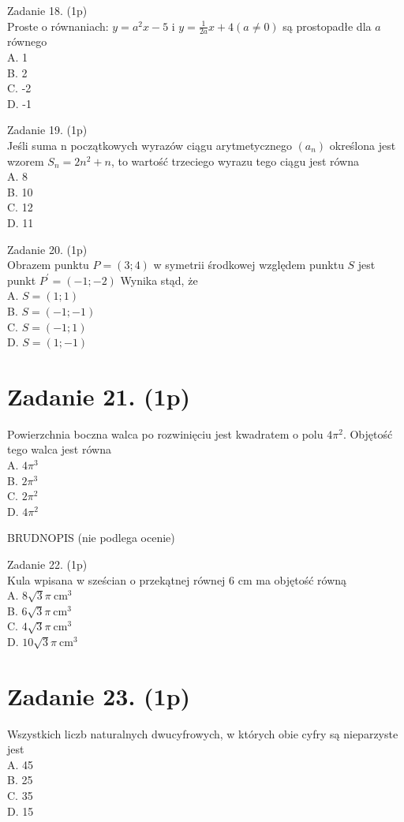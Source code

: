 \documentclass[10pt]{article}
\begin{document}
Zadanie 18. (1p)\\
Proste o równaniach: \(y=a^{2} x-5\) i \(y=\frac{1}{2 a} x+4(a \neq 0)\) są prostopadłe dla \(a\) równego\\
A. 1\\
B. 2\\
C. -2\\
D. -1

Zadanie 19. (1p)\\
Jeśli suma n początkowych wyrazów ciągu arytmetycznego \(\left(a_{n}\right)\) określona jest wzorem \(S_{n}=2 n^{2}+n\), to wartość trzeciego wyrazu tego ciągu jest równa\\
A. 8\\
B. 10\\
C. 12\\
D. 11

Zadanie 20. (1p)\\
Obrazem punktu \(P=(3 ; 4)\) w symetrii środkowej względem punktu \(S\) jest punkt \(P^{\prime}=(-1 ;-2)\) Wynika stąd, że\\
A. \(S=(1 ; 1)\)\\
B. \(S=(-1 ;-1)\)\\
C. \(S=(-1 ; 1)\)\\
D. \(S=(1 ;-1)\)

\section*{Zadanie 21. (1p)}
Powierzchnia boczna walca po rozwinięciu jest kwadratem o polu \(4 \pi^{2}\). Objętość tego walca jest równa\\
A. \(4 \pi^{3}\)\\
B. \(2 \pi^{3}\)\\
C. \(2 \pi^{2}\)\\
D. \(4 \pi^{2}\)

BRUDNOPIS (nie podlega ocenie)

Zadanie 22. (1p)\\
Kula wpisana w sześcian o przekątnej równej 6 cm ma objętość równą\\
A. \(8 \sqrt{3} \pi \mathrm{~cm}^{3}\)\\
B. \(6 \sqrt{3} \pi \mathrm{~cm}^{3}\)\\
C. \(4 \sqrt{3} \pi \mathrm{~cm}^{3}\)\\
D. \(10 \sqrt{3} \pi \mathrm{~cm}^{3}\)

\section*{Zadanie 23. (1p)}
Wszystkich liczb naturalnych dwucyfrowych, w których obie cyfry są nieparzyste jest\\
A. 45\\
B. 25\\
C. 35\\
D. 15
\end{document}
